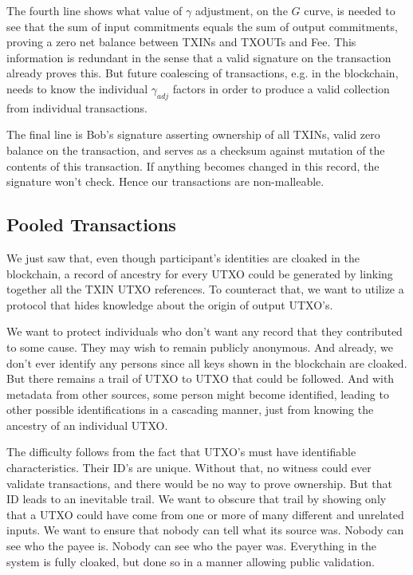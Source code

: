 \documentclass[a4paper, 10pt, conference]{ieeeconf}
\begin{document}
The fourth line shows what value of $\gamma$ adjustment, on the $G$ curve, is needed to see that the sum of input commitments equals the sum of output commitments, proving a zero net balance between TXINs and TXOUTs and Fee. This information is redundant in the sense that a valid signature on the transaction already proves this. But future coalescing of transactions, e.g. in the blockchain, needs to know the individual $\gamma_{\mathit{adj}}$ factors in order to produce a valid collection from individual transactions.

The final line is Bob's signature asserting ownership of all TXINs, valid zero balance on the transaction, and serves as a checksum against mutation of the contents of this transaction. If anything becomes changed in this record, the signature won't check. Hence our transactions are non-malleable.

\subsection{Pooled Transactions}
We just saw that, even though participant's identities are cloaked in the blockchain, a record of ancestry for every UTXO could be generated by linking together all the TXIN UTXO references. To counteract that, we want to utilize a protocol that hides knowledge about the origin of output UTXO's.

We want to protect individuals who don't want any record that they contributed to some cause. They may wish to remain publicly anonymous. And already, we don't ever identify any persons since all keys shown in the blockchain are cloaked. But there remains a trail of UTXO to UTXO that could be followed. And with metadata from other sources, some person might become identified, leading to other possible identifications in a cascading manner, just from knowing the ancestry of an individual UTXO.

The difficulty follows from the fact that UTXO's must have identifiable characteristics. Their ID's are unique. Without that, no witness could ever validate transactions, and there would be no way to prove ownership. But that ID leads to an inevitable trail. We want to obscure that trail by showing only that a UTXO could have come from one or more of many different and unrelated inputs. We want to ensure that nobody can tell what its source was. Nobody can see who the payee is. Nobody can see who the payer was. Everything in the system is fully cloaked, but done so in a manner allowing public validation.
\end{document}
